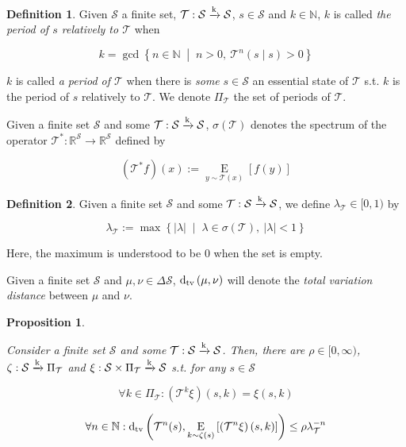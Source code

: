 \documentclass[11pt]{article}
\theoremstyle{definition}
\newtheorem{definition}{Definition}%
\theoremstyle{plain}
\newtheorem{proposition}{Proposition}%
\newcommand{\AP}[1]{\left(#1\right)}
\newcommand{\AB}[1]{\left[#1\right]}
\newcommand{\ACM}[2]{\left\{#1\;\middle\vert\;#2\right\}}
\newcommand{\Ea}[2]{\underset{#1}{\operatorname{E}}\AB{#2}}
\newcommand{\Dtva}[1]{\operatorname{d}_{\textnormal{tv}}\AP{#1}}
\newcommand{\Nats}{\mathbb{N}}
\newcommand{\Reals}{\mathbb{R}}
\newcommand{\Abs}[1]{\left\vert #1 \right\vert}
\newcommand{\K}{\xrightarrow{\textnormal{k}}}
\newcommand{\St}{\mathcal{S}}
\newcommand{\T}{\mathcal{T}}
\begin{document}
\begin{samepage}
\begin{definition}

Given $\St$ a finite set, $\T: \St \K \St$, $s \in \St$ and $k \in \Nats$, $k$ is called \emph{the period of $s$ relatively to $\T$} when 

\begin{equation}
k = \gcd \ACM{n \in \Nats}{n > 0,\ \T^n(s \mid s) > 0}
\end{equation}

$k$ is called \emph{a period of $\T$} when there is \emph{some} $s \in \St$ an essential state of $\T$ s.t. $k$ is the period of $s$ relatively to $\T$. We denote $\Pi_\T$ the set of periods of $\T$.

\end{definition}
\end{samepage}

Given a finite set $\St$ and some $\T: \St \K \St$, $\sigma(\T)$ denotes the spectrum of the operator $\T^*: \Reals^\St \rightarrow \Reals^\St$ defined by

\[\AP{\T^*f}(x):=\Ea{y\sim \T(x)}{f(y)}\]

\begin{samepage}
\begin{definition}

Given a finite set $\St$ and some $\T: \St \K \St$, we define $\lambda_\T\in[0,1)$ by

\begin{equation}
\lambda_\T := \max\ACM{\Abs{\lambda}}{\lambda \in \sigma\AP{\T},\ \Abs{\lambda} < 1}
\end{equation}

Here, the maximum is understood to be 0 when the set is empty.

\end{definition}
\end{samepage}

Given a finite set $\St$ and $\mu,\nu \in \Delta\St$, $\Dtva{\mu,\nu}$ will denote the \emph{total variation distance} between $\mu$ and $\nu$.

\begin{samepage}
\begin{proposition}
\label{prp:mixing_time}

Consider a finite set $\St$ and some $\T: \St \K \St$. Then, there are $\rho\in[0,\infty)$, $\zeta: \St \K \Pi_\T$ and $\xi: \St \times \Pi_\T \K \St$ s.t. for any $s\in\St$

\begin{equation}
\label{eqn:prp__mixing_time_periodic}
\forall k \in \Pi_\T: \AP{\T^k\xi}(s,k) = \xi(s,k)
\end{equation}

\begin{equation}
\label{eqn:prp__mixing_time_decaying}
\forall n \in \Nats: \Dtva{\T^n(s),\Ea{k\sim\zeta(s)}{\AP{\T^n\xi}(s,k)}} \leq \rho\lambda_\T^{-n}
\end{equation}

\end{proposition}
\end{samepage}
\end{document}
